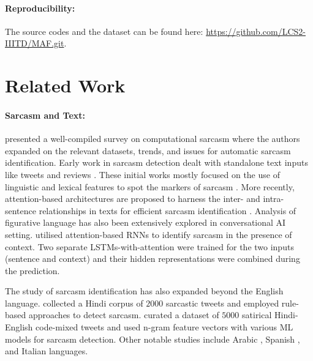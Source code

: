 \documentclass[11pt]{article}
\begin{document}
\paragraph{Reproducibility:} The source codes and the dataset can be found here: \href{https://github.com/LCS2-IIITD/MAF.git}{https://github.com/LCS2-IIITD/MAF.git}.

\section{Related Work}
\paragraph{Sarcasm and Text:}
\citet{1joshi2017automatic} presented a well-compiled survey on computational sarcasm where the authors expanded on the relevant datasets, trends, and issues for automatic sarcasm identification. Early work in sarcasm detection dealt with standalone text inputs like tweets and reviews \cite{kreuz-caucci:2007:sarcasm:lexical, tsur:sarcasm:2010, joshi:sarcsam:incongruity:2015, peled-reichart-2017-sarcasm}. These initial works mostly focused on the use of linguistic and lexical features to spot the markers of sarcasm \citep{kreuz-caucci:2007:sarcasm:lexical,tsur:sarcasm:2010}. 
More recently, attention-based architectures are  proposed to harness the inter- and intra-sentence relationships in texts for efficient sarcasm identification \citep{tay-etal-2018-reasoning, xiong2019sarcasm, srivastava-etal-2020-novel}. Analysis of figurative language has also been extensively explored in conversational AI setting. \citet{ghosh2017role} utilised attention-based RNNs to identify sarcasm in the presence of context. Two separate LSTMs-with-attention were trained for the two inputs (sentence and context) and their hidden representations were combined during the prediction.

The study of sarcasm identification has also expanded beyond the English language. \citet{bharti2017harnessing} collected a Hindi corpus of $2000$ sarcastic tweets and employed rule-based approaches to detect sarcasm. \citet{swami2018corpus} curated a dataset of $5000$ satirical Hindi-English code-mixed tweets and used n-gram feature vectors with various ML models for sarcasm detection. Other notable studies include Arabic \citep{abu-farha-magdy-2020-arabic}, Spanish \citep{ortega2019overview}, and Italian \citep{cignarella2018overview} languages.
\end{document}
